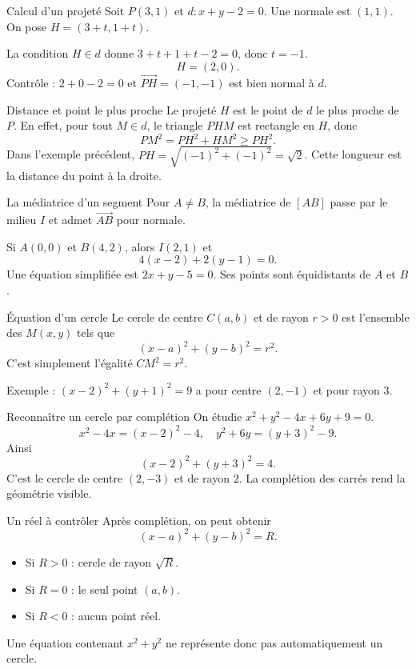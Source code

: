\documentclass[aspectratio=169,12pt]{beamer}
\begin{document}
\renewcommand{\slidekind}{MÉTHODE \& EXEMPLE}
\begin{frame}[t,fragile]{Calcul d’un projeté}
Soit $P(3,1)$ et $d:x+y-2=0$. Une normale est $(1,1)$. On pose $H=(3+t,1+t)$.\medskip\par La condition $H\in d$ donne $3+t+1+t-2=0$, donc $t=-1$.\[H=(2,0).\]Contrôle : $2+0-2=0$ et $\overrightarrow{PH}=(-1,-1)$ est bien normal à $d$.
\end{frame}
\renewcommand{\slidekind}{COMPRENDRE}
\begin{frame}[t,fragile]{Distance et point le plus proche}
Le projeté $H$ est le point de $d$ le plus proche de $P$. En effet, pour tout $M\in d$, le triangle $PHM$ est rectangle en $H$, donc\[PM^2=PH^2+HM^2\ge PH^2.\]Dans l’exemple précédent, $PH=\sqrt{(-1)^2+(-1)^2}=\sqrt2$. Cette longueur est la distance du point à la droite.
\end{frame}
\renewcommand{\slidekind}{COMPRENDRE}
\begin{frame}[t,fragile]{La médiatrice d’un segment}
Pour $A\ne B$, la médiatrice de $[AB]$ passe par le milieu $I$ et admet $\overrightarrow{AB}$ pour normale.\medskip\par Si $A(0,0)$ et $B(4,2)$, alors $I(2,1)$ et\[4(x-2)+2(y-1)=0.\]Une équation simplifiée est $2x+y-5=0$. Ses points sont équidistants de $A$ et $B$.
\end{frame}
\renewcommand{\slidekind}{MÉTHODE \& EXEMPLE}
\begin{frame}[t,fragile]{Équation d’un cercle}
Le cercle de centre $C(a,b)$ et de rayon $r>0$ est l’ensemble des $M(x,y)$ tels que\[\boxed{(x-a)^2+(y-b)^2=r^2}.\]C’est simplement l’égalité $CM^2=r^2$.\medskip\par Exemple : $(x-2)^2+(y+1)^2=9$ a pour centre $(2,-1)$ et pour rayon $3$.
\end{frame}
\renewcommand{\slidekind}{COMPRENDRE}
\begin{frame}[t,fragile]{Reconnaître un cercle par complétion}
On étudie $x^2+y^2-4x+6y+9=0$.\[x^2-4x=(x-2)^2-4,\quad y^2+6y=(y+3)^2-9.\]Ainsi\[(x-2)^2+(y+3)^2=4.\]C’est le cercle de centre $(2,-3)$ et de rayon $2$. La complétion des carrés rend la géométrie visible.
\end{frame}
\renewcommand{\slidekind}{À RETENIR}
\begin{frame}[t,fragile]{Un réel à contrôler}
Après complétion, on peut obtenir\[(x-a)^2+(y-b)^2=R.\]\begin{itemize}\item Si $R>0$ : cercle de rayon $\sqrt R$.\item Si $R=0$ : le seul point $(a,b)$.\item Si $R<0$ : aucun point réel.\end{itemize}Une équation contenant $x^2+y^2$ ne représente donc pas automatiquement un cercle.
\end{frame}
\end{document}
